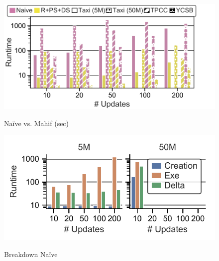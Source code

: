 \begin{figure}[t]
\begin{minipage}[b]{0.29\linewidth}
               \centering
               \includegraphics[width=1.1\linewidth,trim=0            0 0                                     0,                             clip]{imgs/felix_naive.pdf}              \\
               \vspace{-4mm}
               \caption{Naïve                                         vs.                                     Mahif                          (sec)}
               \label{fig:Naive                                       vs                                      Mahif}
               \end{minipage}
               \begin{minipage}[b]{0.35\linewidth}
               \centering
               \includegraphics[width=0.95\linewidth,trim=0 8 0                                     0,                             clip]{imgs/felix_naive_breakdown.pdf}    \\
               \vspace{-3mm}
               \caption{Breakdown Naïve}

\end{minipage}
\end{figure}

